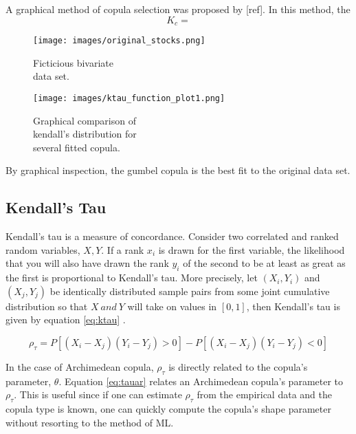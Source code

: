 A graphical method of copula selection was proposed by [ref].  In this method, the 
\begin{equation}
K_c = 
\end{equation}

\begin{figure}[!htbp]
\centering
\begin{minipage}{.45\textwidth}
  \texttt{[image: images/original\_stocks.png]}
\caption{Ficticious bivariate \\ data set.}
\label{fig:biv_data_ex}
\end{minipage}%
\begin{minipage}{.45\textwidth}
  \texttt{[image: images/ktau\_function\_plot1.png]}
\caption{Graphical comparison of  \\ kendall's distribution for \\ several fitted copula.}
\label{fig:kc_fn_compare}
\end{minipage}
\end{figure}
By graphical inspection, the gumbel copula is the best fit to the original data set.

\subsection*{Kendall's Tau}

Kendall's tau is a measure of concordance.  Consider two correlated and ranked random variables, $X, Y$.
If a rank $x_i$ is drawn for the first variable, the likelihood that you will also have drawn the rank $y_i$ of the second to be at least as great as the first is proportional to Kendall's tau.  More precisely, let $(X_i, Y_i)$ and $(X_j, Y_j)$ be identically distributed sample pairs from some joint cumulative distribution so that $X\ and\ Y$ will take on values in $[0,1]$, then Kendall's tau is given by equation \ref{eq:ktau} \cite{Nelsen2006}.  

\begin{equation}
\rho_\tau = P[(X_i - X_j)(Y_i-Y_j)>0] - P[(X_i - X_j)(Y_i - Y_j)<0]
\label{eq:ktau}
\end{equation}

In the case of Archimedean copula, $\rho_\tau$ is directly related to the copula's parameter, $\theta$.
Equation \ref{eq:tauar} relates an Archimedean copula's parameter to $\rho_\tau$.  This is useful since if one can estimate $\rho_\tau$ from the empirical data and the copula type is known, one can quickly compute the copula's shape parameter without resorting to the method of ML.

